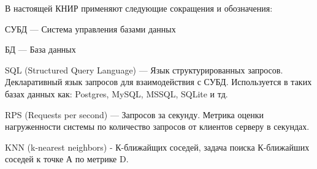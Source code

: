 \Abbreviations %
В настоящей КНИР применяют следующие сокращения и обозначения:

\noindent СУБД --- Система управления базами данных

\noindent БД --- База данных

\noindent SQL (Structured Query Language) --- Язык структурированных запросов. Декларативный язык запросов для взаимодействия с СУБД. Используется в таких базах данных как: Postgres, MySQL, MSSQL, SQLite и тд.

\noindent RPS (Requests per second) --- Запросов за секунду. Метрика оценки нагруженности системы по количество запросов от клиентов серверу в секундах.

\noindent KNN (k-nearest neighbors) - К-ближайщих соседей, задача поиска К-ближайших соседей к точке А по метрике D.


